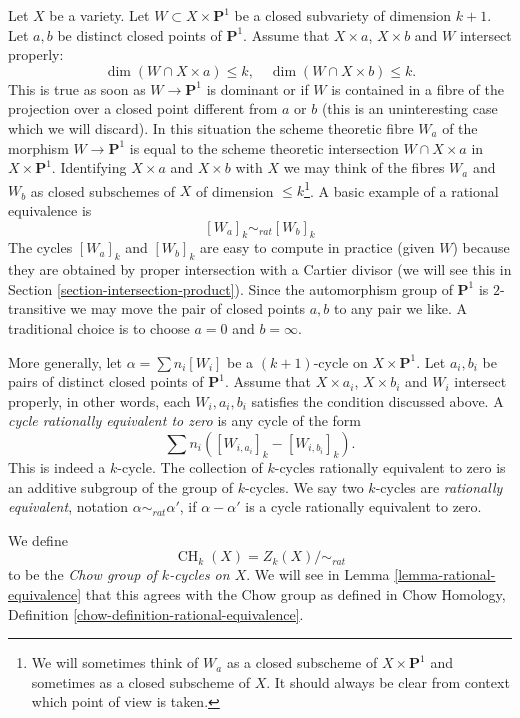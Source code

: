 \documentclass{stacks-project}
\theoremstyle{plain}
\theoremstyle{definition}
\theoremstyle{remark}
\numberwithin{equation}{subsection}
\def\CH{\mathop{\mathrm{CH}}\nolimits}
\begin{document}
\medskip\noindent
Let $X$ be a variety. Let $W \subset X \times \mathbf{P}^1$
be a closed subvariety of dimension $k + 1$. Let $a, b$ be distinct closed
points of $\mathbf{P}^1$. Assume that $X \times a$, $X \times b$ and $W$
intersect properly:
$$
\dim (W \cap X \times a) \leq k,\quad
\dim (W \cap X \times b) \leq k.
$$
This is true as soon as $W \to \mathbf{P}^1$ is dominant or if $W$ is
contained in a fibre of the projection over a closed point different from
$a$ or $b$ (this is an uninteresting case which we will discard). In this
situation the scheme theoretic fibre $W_a$ of the morphism
$W \to \mathbf{P}^1$ is equal to the scheme theoretic intersection
$W \cap X \times a$ in $X \times \mathbf{P}^1$. Identifying $X \times a$
and $X \times b$ with $X$ we may think of the fibres $W_a$ and $W_b$
as closed subschemes of $X$ of dimension $\leq k$\footnote{We will sometimes
think of $W_a$ as a closed subscheme of $X \times \mathbf{P}^1$ and sometimes
as a closed subscheme of $X$. It should always be clear from context which
point of view is taken.}. A basic example of a
rational equivalence is
$$
[W_a]_k \sim_{rat} [W_b]_k
$$
The cycles $[W_a]_k$ and $[W_b]_k$ are easy to compute in practice
(given $W$) because they are obtained by proper intersection with
a Cartier divisor (we will see this in
Section \ref{section-intersection-product}).
Since the automorphism group of $\mathbf{P}^1$ is $2$-transitive we may
move the pair of closed points $a, b$ to any pair we like. A traditional
choice is to choose $a = 0$ and $b = \infty$.

\medskip\noindent
More generally, let $\alpha = \sum n_i [W_i]$ be a $(k + 1)$-cycle on
$X \times \mathbf{P}^1$.  Let $a_i, b_i$ be pairs of distinct closed points of
$\mathbf{P}^1$. Assume that $X \times a_i$, $X \times b_i$ and $W_i$ intersect
properly, in other words, each $W_i, a_i, b_i$ satisfies the condition
discussed above. A {\it cycle rationally equivalent to zero} is any cycle
of the form
$$
\sum n_i([W_{i, a_i}]_k - [W_{i, b_i}]_k).
$$
This is indeed a $k$-cycle. The collection of $k$-cycles rationally
equivalent to zero is an additive subgroup of the group of $k$-cycles.
We say two $k$-cycles are {\it rationally equivalent}, notation
$\alpha \sim_{rat} \alpha'$, if $\alpha - \alpha'$ is a cycle rationally
equivalent to zero.

\medskip\noindent
We define
$$
\CH_k(X) = Z_k(X)/ \sim_{rat}
$$
to be the {\it Chow group of $k$-cycles on $X$}. We will see in
Lemma \ref{lemma-rational-equivalence}
that this agrees with the Chow group as defined in
Chow Homology, Definition \ref{chow-definition-rational-equivalence}.
\end{document}
